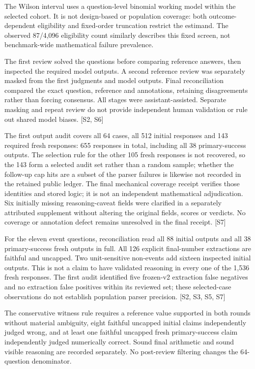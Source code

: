 \documentclass[12pt,a4paper]{report}
\begin{document}
The Wilson interval uses a question-level binomial working model within
the selected cohort. It is not design-based or population coverage: both
outcome-dependent eligibility and fixed-order truncation restrict the
estimand. The observed 87/4,096 eligibility count similarly describes
this fixed screen, not benchmark-wide mathematical failure prevalence.

The first review solved the questions before comparing reference
answers, then inspected the required model outputs. A second reference
review was separately masked from the first judgments and model outputs.
Final reconciliation compared the exact question, reference and
annotations, retaining disagreements rather than forcing consensus. All
stages were assistant-assisted. Separate masking and repeat review do
not provide independent human validation or rule out shared model
biases. {[}S2, S6{]}

The first output audit covers all 64 cases, all 512 initial responses
and 143 required fresh responses: 655 responses in total, including all
38 primary-success outputs. The selection rule for the other 105 fresh
responses is not recovered, so the 143 form a selected audit set rather
than a random sample; whether the follow-up cap hits are a subset of the
parser failures is likewise not recorded in the retained public ledger.
The final mechanical coverage receipt verifies those identities and
stored logic; it is not an independent mathematical adjudication. Six
initially missing reasoning-caveat fields were clarified in a separately
attributed supplement without altering the original fields, scores or
verdicts. No coverage or annotation defect remains unresolved in the
final receipt. {[}S7{]}

For the eleven event questions, reconciliation read all 88 initial
outputs and all 38 primary-success fresh outputs in full. All 126
explicit final-number extractions are faithful and uncapped. Two
unit-sensitive non-events add sixteen inspected initial outputs. This is
not a claim to have validated reasoning in every one of the 1,536 fresh
responses. The first audit identified five frozen-v2 extraction false
negatives and no extraction false positives within its reviewed set;
these selected-case observations do not establish population parser
precision. {[}S2, S3, S5, S7{]}

The conservative witness rule requires a reference value supported in
both rounds without material ambiguity, eight faithful uncapped initial
claims independently judged wrong, and at least one faithful uncapped
fresh primary-success claim independently judged numerically correct.
Sound final arithmetic and sound visible reasoning are recorded
separately. No post-review filtering changes the 64-question
denominator.
\end{document}
